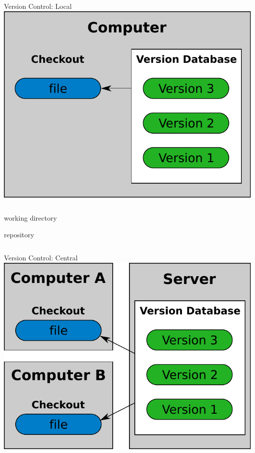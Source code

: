 \documentclass{beamer}
\begin{document}

\begin{frame}{Version Control: Local}
\centering
\includegraphics[height=.5\textheight]{own_fig/vc_single}  

\begin{columns}

\begin{description}
 \item[checkout] working directory
 \item[version database] repository
\end{description}

\end{columns}
  
\end{frame}


\begin{frame}{Version Control: Central}
\centering
\includegraphics[height=.5\textheight]{own_fig/vc_central}

\end{frame}
\end{document}
